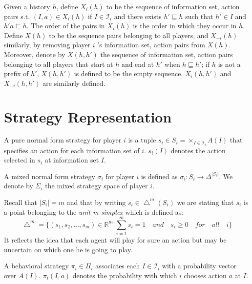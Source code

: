 Given a history $h$, define $X_i(h)$ to be the sequence of information set, action pairs s.t. $(I,a)\in X_i(h)$ if $I\in\mathcal{I}_i$ and there exists $h'\sqsubseteq h$ such that $h'\in I$ and $h'a\sqsubseteq h$. The order of the pairs in $X_i(h)$ is the order in which they occur in $h$. Define $X(h)$ to be the sequence pairs belonging to all players, and $X_{-i}(h)$ similarly, by removing player $i$ 's information set,
action pairs from $X(h)$. Moreover, denote by $X(h, h')$ the sequence of information set, action pairs belonging to all players that start at $h$ and end at $h'$ when $h\sqsubseteq h'$; if $h$ is not a prefix of $h'$, $X(h,h')$ is defined to be the empty sequence. $X_i(h,h')$ and $X_{-i}(h,h')$ are similarly defined.

\section{Strategy Representation}

\begin{definition} A pure normal form strategy for player $i$ is a tuple $s_i\in S_i=\times_{I\in\mathcal{I}_i} A(I)$ that specifies an action for each information set of $i$. $s_i(I)$ denotes the action selected in $s_i$ at information set $I$.
\end{definition}

\begin{definition} A mixed normal form strategy $\sigma_i$ for player $i$ is defined as $\sigma_i:S_i\to\Delta^{|S_i|}$. We denote by $\Sigma_i$ the mixed strategy space of player $i$.
\end{definition}

Recall that $|S_{i}|=m$ and that by writing $s_{i}\in\bigtriangleup^{m}(S_{i})$ we are stating that $s_{i}$ is a point belonging to the \textit{unit m-simplex} which is defined as: $$\bigtriangleup^{m}=\{(s_{1},s_{2},\ldots,s_{m})\in \mathbb{R}^{m}|\sum_{i=1}^{m}s_{i}=1 \quad and \quad s_{i}\geq 0 \quad for \quad all \quad i\}$$ It reflects the idea that each agent will play for sure an action but may be uncertain on which one he is going to play.

\begin{definition} A behavioral strategy $\pi_i\in\Pi_i$ associates each $I\in\mathcal{I}_i$ with a probability vector over $A(I)$. $\pi_i(I,a)$ denotes the probability with which $i$ chooses action $a$ at $I$. 
\end{definition}
 
